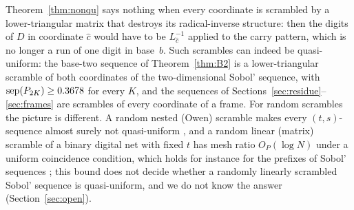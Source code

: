 \begin{remark}\label{rem:escape}
Theorem~\ref{thm:nonqu} says nothing when every coordinate is scrambled by a lower-triangular matrix that destroys its radical-inverse structure: then the digits of $D$ in coordinate $\hat c$ would have to be $L_{\hat c}^{-1}$ applied to the carry pattern, which is no longer a run of one digit in base~$b$. Such scrambles can indeed be quasi-uniform: the base-two sequence of Theorem~\ref{thm:B2} is a lower-triangular scramble of both coordinates of the two-dimensional Sobol' sequence, with $\operatorname{sep}(P_{2K})\ge0.3678$ for every $K$, and the sequences of Sections~\ref{sec:residue}--\ref{sec:frames} are scrambles of every coordinate of a frame. For random scrambles the picture is different. A random nested (Owen) scramble makes every $(t,s)$-sequence almost surely not quasi-uniform \cite{Suz26}, and a random linear (matrix) scramble of a binary digital net with fixed $t$ has mesh ratio $O_P(\log N)$ under a uniform coincidence condition, which holds for instance for the prefixes of Sobol' sequences \cite[Thm.~5.5, Lem.~4.10]{Suz26}; this bound does not decide whether a randomly linearly scrambled Sobol' sequence is quasi-uniform, and we do not know the answer (Section~\ref{sec:open}).
\end{remark}
